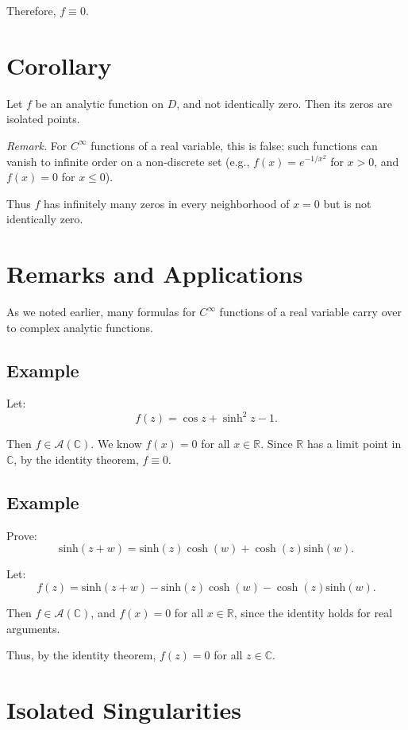 \documentclass[12pt]{article}
\theoremstyle{definition} %
\theoremstyle{plain} %
\begin{document}
Therefore, $f \equiv 0$.

\section*{Corollary}

Let $f$ be an analytic function on $D$, and not identically zero. Then its zeros are isolated points.

\textit{Remark.} For $C^\infty$ functions of a real variable, this is false: such functions can vanish to infinite order on a non-discrete set (e.g., $f(x) = e^{-1/x^2}$ for $x > 0$, and $f(x) = 0$ for $x \leq 0$).

Thus $f$ has infinitely many zeros in every neighborhood of $x = 0$ but is not identically zero.

\section*{Remarks and Applications}

As we noted earlier, many formulas for $C^\infty$ functions of a real variable carry over to complex analytic functions.

\subsection*{Example}

Let:
\[
f(z) = \cos z + \sinh^2 z - 1.
\]

Then $f \in \mathcal{A}(\mathbb{C})$. We know $f(x) = 0$ for all $x \in \mathbb{R}$. Since $\mathbb{R}$ has a limit point in $\mathbb{C}$, by the identity theorem, $f \equiv 0$.

\subsection*{Example}

Prove:
\[
\text{sinh}(z + w) = \text{sinh}(z)\cosh(w) + \cosh(z)\text{sinh}(w).
\]

Let:
\[
f(z) = \text{sinh}(z + w) - \text{sinh}(z)\cosh(w) - \cosh(z)\text{sinh}(w).
\]

Then $f \in \mathcal{A}(\mathbb{C})$, and $f(x) = 0$ for all $x \in \mathbb{R}$, since the identity holds for real arguments.

Thus, by the identity theorem, $f(z) = 0$ for all $z \in \mathbb{C}$.
\section*{Isolated Singularities}
\end{document}
